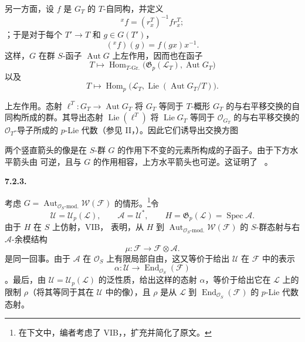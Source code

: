 另一方面，设 \(f\) 是 \(G_T\) 的 \(T\)-自同构，并定义
\[
  {}^x f=(r_x^T)^{-1}fr_x^T;
\]
；于是对于每个 \(T'\to T\) 和 \(g\in G(T')\)，
\[
  ({}^x f)(g)=f(gx)x^{-1}.
\]
这样，\(G\) 在群 \(S\)-函子 \(\operatorname{Aut}G\) 上左作用，因而也在函子
\[
  T\longmapsto
  \operatorname{Hom}_{T\text{-Gr.}}
    \bigl(\mathfrak G_p(\mathcal L_T),
          \operatorname{Aut}G_T\bigr)
\]
以及
\[
  T\longmapsto
  \operatorname{Hom}_p
    \bigl(
      \mathcal L_T,
      \operatorname{Lie}(\operatorname{Aut}G_T/T)
    \bigr).
\]

上左作用。态射 \(\ell^T:G_T\to\operatorname{Aut}G_T\) 将 \(G_T\) 等同于 \(T\)-概形 \(G_T\) 的与右平移交换的自同构所成的群。其导出态射 \(\operatorname{Lie}(\ell^T)\) 将 \(\operatorname{Lie}G_T\) 等同于 \(\mathcal O_{G_T}\) 的与右平移交换的 \(\mathcal O_T\)-导子所成的 \(p\)-Lie 代数（参见 II，）。因此它们诱导出交换方图
\begin{center}
  \label{sga3:VIIA:7.2.2-lie-invariant-commutative-squares}
  
\end{center}
两个竖直箭头的像是在 \(S\)-群 \(G\) 的作用下不变的元素所构成的子函子。由于下方水平箭头由  可逆，且与 \(G\) 的作用相容，上方水平箭头也可逆。这证明了 ~。

\medskip
\noindent\textbf{7.2.3.}
\label{sga3:VIIA:7.2.3}

考虑
\(
  G=
  \operatorname{Aut}_{\mathcal O_S\text{-mod.}}
    \mathcal W(\mathcal F)
\)
的情形。\footnote{在下文中，编者考虑了 VIB，，扩充并简化了原文。}令
\[
  \mathcal U=\mathcal U_p(\mathcal L),
  \qquad
  \mathcal A=\mathcal U^{*},
  \qquad
  H=\mathfrak G_p(\mathcal L)=\operatorname{Spec}\mathcal A.
\]
由于 \(H\) 在 \(S\) 上仿射，VIB， 表明，从 \(H\) 到 \(\operatorname{Aut}_{\mathcal O_S\text{-mod.}}\mathcal W(\mathcal F)\) 的 \(S\)-群态射与右 \(\mathcal A\)-余模结构
\[
  \mu:\mathcal F\longrightarrow\mathcal F\otimes\mathcal A.
\]
是同一回事。由于 \(\mathcal A\) 在 \(\mathcal O_S\) 上有限局部自由，这又等价于给出 \(\mathcal U\) 在 \(\mathcal F\) 中的表示
\[
  \alpha:
  \mathcal U
  \longrightarrow
  \operatorname{End}_{\mathcal O_S}(\mathcal F)
\]
。最后，由 \(\mathcal U=\mathcal U_p(\mathcal L)\) 的泛性质，给出这样的态射 \(\alpha\)，等价于给出它在 \(\mathcal L\) 上的限制 \(\rho\)（将其等同于其在 \(\mathcal U\) 中的像），且 \(\rho\) 是从 \(\mathcal L\) 到 \(\operatorname{End}_{\mathcal O_S}(\mathcal F)\) 的 \(p\)-Lie 代数态射。


